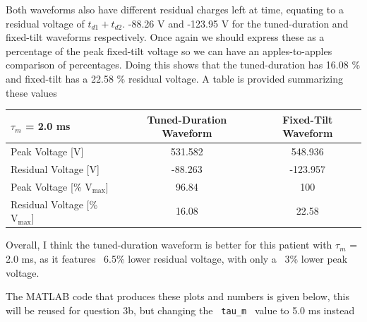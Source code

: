 \documentclass[]{report}
\begin{document}
Both waveforms also have different residual charges left at time, equating to a residual voltage of $t_{d1} + t_{d2}$. -88.26 V and -123.95 V for the tuned-duration and fixed-tilt waveforms respectively. Once again we should express these as a percentage of the peak fixed-tilt voltage so we can have an apples-to-apples comparison of percentages. Doing this shows that the tuned-duration has 16.08 \% and fixed-tilt has a 22.58 \% residual voltage. A table is provided summarizing these values

\begin{table}[H]
	\centering
	\begin{tabular}{@{}lcc@{}}
		\toprule
		$\tau_m$ = 2.0 ms                     & Tuned-Duration Waveform & Fixed-Tilt Waveform \\ \midrule
		Peak Voltage {[}V{]}                  & 531.582               & 548.936             \\
		Residual Voltage {[}V{]}              & -88.263                 & -123.957           \\
		Peak Voltage {[}\% $\text{V}_\text{max}${]}  & 96.84                   & 100                 \\
		Residual Voltage {[}\% $\text{V}_\text{max}${]} & 16.08                   & 22.58              
	\end{tabular}
\end{table}

Overall, I think the tuned-duration waveform is better for this patient with $\tau_m$ = 2.0 ms, as it features ~6.5\% lower residual voltage, with only a ~3\% lower peak voltage.

The MATLAB code that produces these plots and numbers is given below, this will be reused for question 3b, but changing the \texttt{ tau\_m } value to 5.0 ms instead
\end{document}

